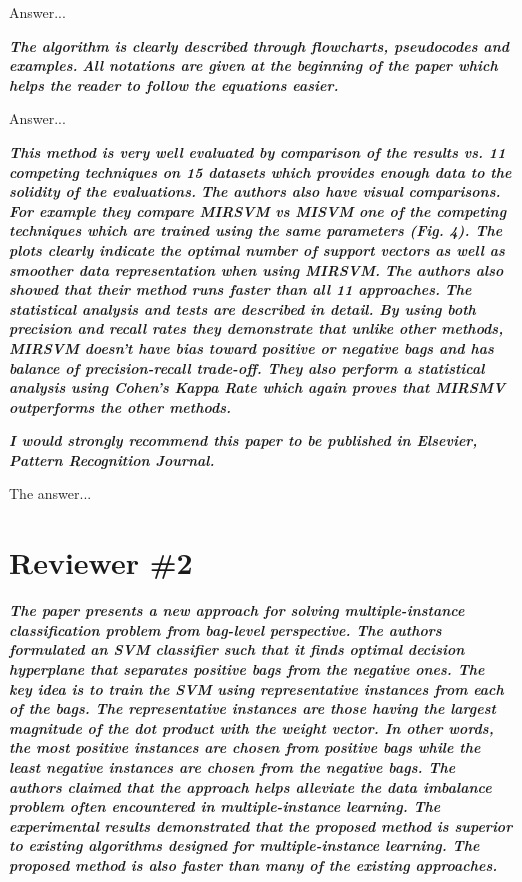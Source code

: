 \documentclass[a4paper,notitlepage]{article}
\begin{document}
\medskip

\noindent Answer...

\noindent \textbf{\textit{The algorithm is clearly described through flowcharts, pseudocodes and examples.}}
\noindent \textbf{\textit{All notations are given at the beginning of the paper which helps the reader to follow the equations easier.}}

\medskip

\noindent Answer...

\noindent \textbf{\textit{This method is very well evaluated by comparison of the results vs. 11 competing techniques on 15  datasets which provides enough data to the solidity of the evaluations.}}
\noindent \textbf{\textit{The authors also have visual comparisons. For example they compare MIRSVM vs MISVM one of the competing techniques which are trained using the same parameters (Fig. 4). The plots clearly indicate the optimal number of support vectors as well as smoother data representation when using MIRSVM.}}
\noindent \textbf{\textit{The authors also showed that their method runs faster than all 11 approaches.}}
\noindent \textbf{\textit{The statistical analysis and tests are described in detail. By using both precision and recall rates they demonstrate that unlike other methods, MIRSVM doesn't have bias toward positive or negative bags and has balance of precision-recall trade-off. They also perform a statistical analysis using Cohen's Kappa Rate which again proves that MIRSMV outperforms the other methods.}}

\smallskip

\noindent  \textbf{\textit{I would strongly recommend this paper to be published in Elsevier, Pattern Recognition Journal.}}

\medskip

\noindent The answer...

\section{Reviewer \#2}

\noindent \textbf{\textit{The paper presents a new approach for solving multiple-instance classification 
problem from bag-level perspective. The authors formulated an SVM classifier such that it finds optimal decision hyperplane that separates positive bags from the negative ones. The key idea is to train the SVM using representative instances from each of the bags. The representative instances are those having the largest magnitude of the dot product with the weight vector. In other words, the most positive instances are chosen from positive bags while the least negative instances are chosen from the 
negative bags. The authors claimed that the approach helps alleviate the data imbalance problem often encountered in multiple-instance learning. The experimental results demonstrated that the proposed method is superior to existing algorithms designed for multiple-instance learning. The proposed method is also faster than many of the existing approaches. }}
\end{document}
